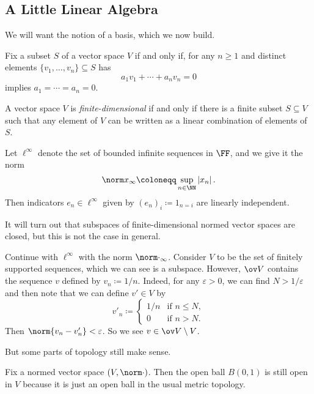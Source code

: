 \documentclass[../notes.tex]{subfiles}
\begin{document}
\subsection{A Little Linear Algebra}
We will want the notion of a basis, which we now build.
\begin{definition}
	Fix a subset $S$ of a vector space $V$ if and only if, for any $n\ge1$ and distinct elements $\{v_1,\ldots,v_n\}\subseteq S$ has
	\[a_1v_1+\cdots+a_nv_n=0\]
	implies $a_1=\cdots=a_n=0$.
\end{definition}
\begin{definition}
	A vector space $V$ is \textit{finite-dimensional} if and only if there is a finite subset $S\subseteq V$ such that any element of $V$ can be written as a linear combination of elements of $S$.
\end{definition}
\begin{example}
	Let $\ell^\infty$ denote the set of bounded infinite sequences in $\FF$, and we give it the norm
	\[\norm x_\infty\coloneqq\sup_{n\in\NN}\left|x_n\right|.\]
	Then indicators $e_n\in\ell^\infty$ given by $(e_n)_i\coloneqq1_{n=i}$ are linearly independent.
\end{example}
It will turn out that subspaces of finite-dimensional normed vector spaces are closed, but this is not the case in general.
\begin{example}
	Continue with $\ell^\infty$ with the norm $\norm\cdot_\infty$. Consider $V$ to be the set of finitely supported sequences, which we can see is a subspace. However, $\ov V$ contains the sequence $v$ defined by $v_n\coloneqq1/n$. Indeed, for any $\varepsilon>0$, we can find $N>1/\varepsilon$ and then note that we can define $v'\in V$ by
	\[v'_n\coloneqq\begin{cases}
		1/n & \text{if }n\le N, \\
		0 & \text{if }n>N.
	\end{cases}\]
	Then $\norm{v_n-v'_n}<\varepsilon$. So we see $v\in\ov V\setminus V$.
\end{example}
But some parts of topology still make sense.
\begin{remark}
	Fix a normed vector space $(V,\norm\cdot)$. Then the open ball $B(0,1)$ is still open in $V$ because it is just an open ball in the usual metric topology.
\end{remark}
\end{document}
